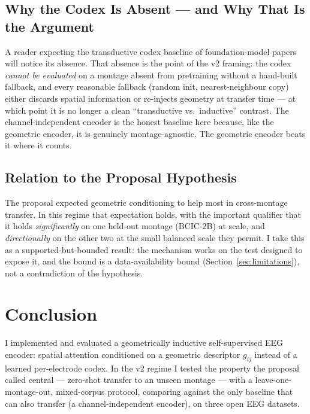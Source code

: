 \documentclass[11pt]{article}
\begin{document}
\subsection{Why the Codex Is Absent --- and Why That Is the Argument}
A reader expecting the transductive codex baseline of foundation-model papers
will notice its absence. That absence is the point of the v2 framing: the
codex \emph{cannot be evaluated} on a montage absent from pretraining without
a hand-built fallback, and every reasonable fallback (random init,
nearest-neighbour copy) either discards spatial information or re-injects
geometry at transfer time --- at which point it is no longer a clean
``transductive vs.\ inductive'' contrast. The channel-independent encoder is
the honest baseline here because, like the geometric encoder, it is genuinely
montage-agnostic. The geometric encoder beats it where it counts.

\subsection{Relation to the Proposal Hypothesis}
The proposal expected geometric conditioning to help most in cross-montage
transfer. In this regime that expectation holds, with the important qualifier
that it holds \emph{significantly} on one held-out montage (BCIC-2B) at
scale, and \emph{directionally} on the other two at the small balanced scale
they permit. I take this as a supported-but-bounded result: the mechanism
works on the test designed to expose it, and the bound is a data-availability
bound (Section~\ref{sec:limitations}), not a contradiction of the hypothesis.

\section{Conclusion}
\label{sec:conclusion}

I implemented and evaluated a geometrically inductive self-supervised EEG
encoder: spatial attention conditioned on a geometric descriptor $g_{ij}$
instead of a learned per-electrode codex. In the v2 regime I tested the
property the proposal called central --- zero-shot transfer to an unseen
montage --- with a leave-one-montage-out, mixed-corpus protocol, comparing
against the only baseline that can also transfer (a channel-independent
encoder), on three open EEG datasets.
\end{document}
